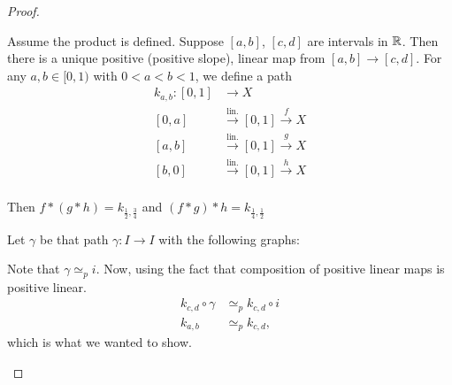 \begin{proof}
\begin{itemize}
            Assume the product is defined.
            Suppose $[a, b]$,  $[c, d]$ are intervals in  $\mathbb{R}$.
            Then there is a unique positive (positive slope), linear map from $[a, b] \to [c,d]$.
            For any $a, b \in [0, 1)$ with $ 0<a<b<1$, we define a path
            \begin{align*}
                k_{a,b}: [0, 1] &\longrightarrow  X\\
                [0, a] & \xrightarrow{\text{lin.}}[0, 1] \xrightarrow{f}  X\\
                [a, b] & \xrightarrow{\text{lin.}}[0, 1] \xrightarrow{g}  X\\
                [b, 0] & \xrightarrow{\text{lin.}}[0, 1] \xrightarrow{h}  X\\
            \end{align*} 

            Then $f*(g*h) = k_{\frac{1}{2}, \frac{3}{4}}$ and $(f*g)*h = k_{\frac{1}{4}, \frac{1}{2}}$

            Let $\gamma$ be that path $\gamma:I \to  I$ with the following graphs:

            Note  that $\gamma \simeq_p i$.
            Now, using the fact that composition of positive linear maps is positive linear.
            \begin{align*}
                k_{c, d}  \circ  \gamma &\simeq_p  k_{c, d}  \circ i\\
                k_{a, b} &\simeq_p  k_{c, d},
            \end{align*} 
            which is what we wanted to show.
    \end{itemize}
\end{proof}

